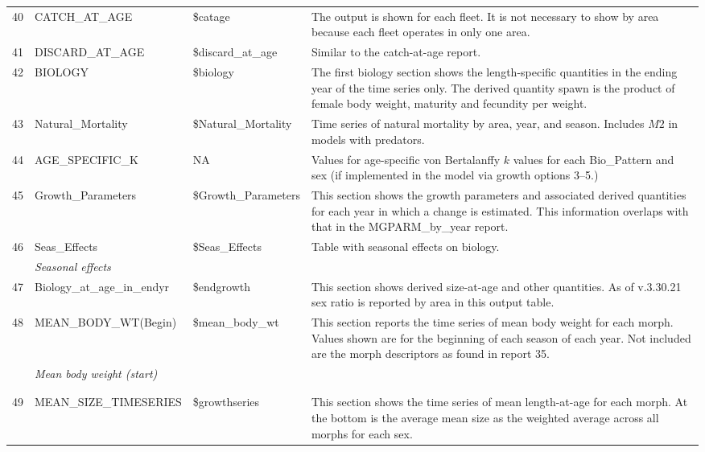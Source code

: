 \begin{landscape}
\begin{longtable}{p{1.5cm} p{5.5cm} >{\RaggedRight\arraybackslash}p{4.25cm} p{9.75cm}}
    40 & CATCH\_AT\_AGE & \$catage & The output is shown for each fleet. It is not necessary to show by area because each fleet operates in only one area. \Bstrut\\
    41 & DISCARD\_AT\_AGE & \$discard\_at\_age & Similar to the catch-at-age report. \Bstrut\\
    42 & BIOLOGY & \$biology & The first biology section shows the length-specific quantities in the ending year of the time series only. The derived quantity spawn is the product of female body weight, maturity and fecundity per weight. \Bstrut\\
    43 & Natural\_Mortality & \$Natural\_Mortality & Time series of natural mortality by area, year, and season. Includes $M2$ in models with predators. \Bstrut\\
    44 & AGE\_SPECIFIC\_K & NA & Values for age-specific von Bertalanffy $k$ values for each Bio\_Pattern and sex (if implemented in the model via growth options 3--5.)\Bstrut\\
    45 & Growth\_Parameters & \$Growth\_Parameters & This section shows the growth parameters and associated derived quantities for each year in which a change is estimated. This information overlaps with that in the MGPARM\_by\_year report. \Bstrut\\
    46 & Seas\_Effects & \$Seas\_Effects & Table with seasonal effects on biology. \\
       & \textit{Seasonal effects} & & \Bstrut\\
    47 & Biology\_at\_age\_in\_endyr & \$endgrowth & This section shows derived size-at-age and other quantities. As of v.3.30.21 sex ratio is reported by area in this output table. \Bstrut\\
    48 & MEAN\_BODY\_WT(Begin) & \$mean\_body\_wt & \multirow{1}{1cm}[-0.25cm]{\parbox{9.5cm}{This section reports the time series of mean body weight for each morph. Values shown are for the beginning of each season of each year. Not included are the morph descriptors as found in report 35.}} \\
       & \textit{Mean body weight (start)} & & \\
       & & & \\
       & & & \Bstrut\\
    49 & MEAN\_SIZE\_TIMESERIES & \$growthseries & This section shows the time series of mean length-at-age for each morph. At the bottom is the average mean size as the weighted average across all morphs for each sex. \Bstrut\\

\end{longtable}
\end{landscape}
